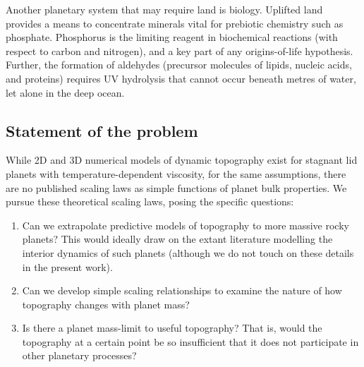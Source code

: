 Another planetary system that may require land is biology. Uplifted land provides a means to concentrate minerals vital for prebiotic chemistry such as phosphate. Phosphorus is the limiting reagent in biochemical reactions (with respect to carbon and nitrogen), and a key part of any origins-of-life hypothesis. Further, the formation of aldehydes (precursor molecules of lipids, nucleic acids, and proteins) requires UV hydrolysis that cannot occur beneath metres of water, let alone in the deep ocean.

\subsection{Statement of the problem}

While 2D and 3D numerical models of dynamic topography exist for stagnant lid planets with temperature-dependent viscosity, for the same assumptions, there are no published scaling laws as simple functions of planet bulk properties. We pursue these theoretical scaling laws, posing the specific questions:

\begin{enumerate}
\item Can we extrapolate predictive models of topography to more massive rocky planets? This would ideally draw on the extant literature modelling the interior dynamics of such planets (although we do not touch on these details in the present work).
\item Can we develop simple scaling relationships to examine the nature of how topography changes with planet mass?
\item Is there a planet mass-limit to useful topography? That is, would the topography at a certain point be so insufficient that it does not participate in other planetary processes?
\end{enumerate}





